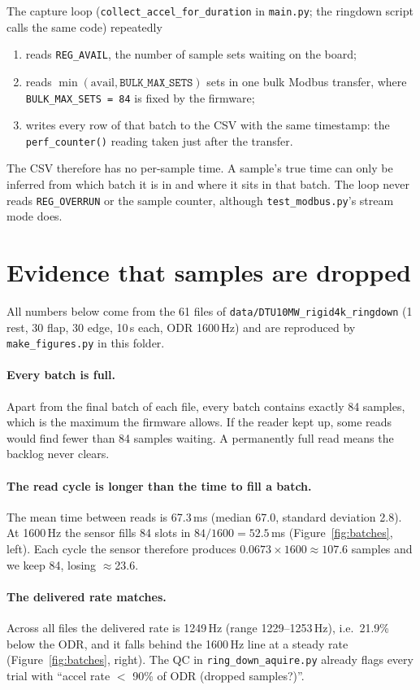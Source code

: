 \documentclass[11pt]{article}
\newcommand{\code}[1]{\texttt{#1}}
\begin{document}
The capture loop (\code{collect\_accel\_for\_duration} in \code{main.py}; the
ringdown script calls the same code) repeatedly
\begin{enumerate}
  \item reads \code{REG\_AVAIL}, the number of sample sets waiting on the board;
  \item reads $\min(\text{avail}, \code{BULK\_MAX\_SETS})$ sets in one bulk
        Modbus transfer, where \code{BULK\_MAX\_SETS = 84} is fixed by the
        firmware;
  \item writes every row of that batch to the CSV with the same timestamp:
        the \code{perf\_counter()} reading taken just after the transfer.
\end{enumerate}
The CSV therefore has no per-sample time. A sample's true time can only be
inferred from which batch it is in and where it sits in that batch. The
loop never reads \code{REG\_OVERRUN} or the sample counter, although
\code{test\_modbus.py}'s stream mode does.

\section{Evidence that samples are dropped}

All numbers below come from the 61 files of
\code{data/DTU10MW\_rigid4k\_ringdown} (1 rest, 30 flap, 30 edge, 10\,s each,
ODR 1600\,Hz) and are reproduced by \code{make\_figures.py} in this folder.

\paragraph{Every batch is full.} Apart from the final batch of each file,
every batch contains exactly 84 samples, which is the maximum the firmware
allows. If the reader kept up, some reads would find fewer than 84
samples waiting. A permanently full read means the backlog never clears.

\paragraph{The read cycle is longer than the time to fill a batch.} The
mean time between reads is 67.3\,ms (median 67.0, standard deviation 2.8). At
1600\,Hz the sensor fills 84 slots in $84/1600 = 52.5$\,ms
(Figure~\ref{fig:batches}, left). Each cycle the sensor therefore produces
$0.0673 \times 1600 \approx 107.6$ samples and we keep 84, losing
$\approx$23.6.

\paragraph{The delivered rate matches.} Across all files the delivered rate
is 1249\,Hz (range 1229--1253\,Hz), i.e.\ 21.9\% below the ODR, and it falls
behind the 1600\,Hz line at a steady rate (Figure~\ref{fig:batches}, right).
The QC in \code{ring\_down\_aquire.py} already flags every trial with
``accel rate $<$ 90\% of ODR (dropped samples?)''.
\end{document}
